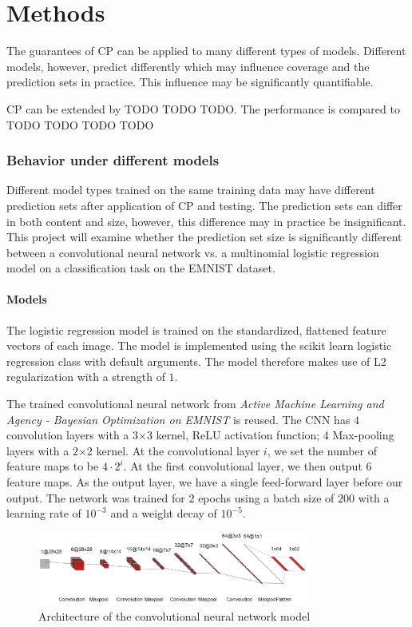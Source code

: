\chapter{Methods}
The guarantees of CP can be applied to many different types of models. Different models, however, predict differently which may influence coverage and the prediction sets in practice. This influence may be significantly quantifiable.

CP can be extended by TODO TODO TODO. The performance is compared to TODO TODO TODO TODO

% 

\subsection{Behavior under different models}
Different model types trained on the same training data may have different prediction sets after application of CP and testing. The prediction sets can differ in both content and size, however, this difference may in practice be insignificant. This project will examine whether the prediction set size is significantly different between a convolutional neural network vs. a multinomial logistic regression model on a classification task on the EMNIST dataset.


\subsubsection{Models}
The logistic regression model is trained on the standardized, flattened feature vectors of each image. The model is implemented using the scikit learn logistic regression class with default arguments. The model therefore makes use of L2 regularization with a strength of $1$.

The trained convolutional neural network from \textit{Active Machine Learning and Agency - Bayesian Optimization on EMNIST} is reused. The CNN has $4$ convolution layers with a $3$×$3$
kernel, ReLU activation function; $4$ Max-pooling layers with a $2$×$2$ kernel. At the convolutional layer $i$, we set the number of feature maps to be $4 \cdot 2^i$. At the first convolutional layer, we then output $6$ feature maps. As the output layer, we have a single feed-forward layer before our output. The network was trained for $2$ epochs using a batch size of $200$ with a learning rate of $10^{-3}$ and a weight decay of $10^{-5}$. 

\begin{figure}
    \centering
    \includegraphics[width=0.8\textwidth]{media/CNN_arch.png}
    \caption{Architecture of the convolutional neural network model}
\end{figure}


